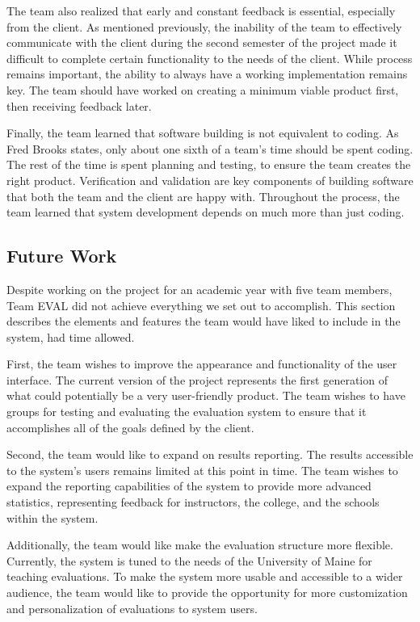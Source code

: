 \documentclass{article}
\begin{document}
The team also realized that early and constant feedback is essential, especially from the client. As mentioned previously, the inability of the team to effectively communicate with the client during the second semester of the project made it difficult to complete certain functionality to the needs of the client. While process remains important, the ability to always have a working implementation remains key. The team should have worked on creating a minimum viable product first, then receiving feedback later. 

Finally, the team learned that software building is not equivalent to coding. As Fred Brooks states, only about one sixth of a team's time should be spent coding. The rest of the time is spent planning and testing, to ensure the team creates the right product. Verification and validation are key components of building software that both the team and the client are happy with. Throughout the process, the team learned that system development depends on much more than just coding. 

\subsection{Future Work}

Despite working on the project for an academic year with five team members, Team EVAL did not achieve everything we set out to accomplish. This section describes the elements and features the team would have liked to include in the system, had time allowed. 

First, the team wishes to improve the appearance and functionality of the user interface. The current version of the project represents the first generation of what could potentially be a very user-friendly product. The team wishes to have groups for testing and evaluating the evaluation system to ensure that it accomplishes all of the goals defined by the client. 

Second, the team would like to expand on results reporting. The results accessible to the system's users remains limited at this point in time. The team wishes to expand the reporting capabilities of the system to provide more advanced statistics, representing feedback for instructors, the college, and the schools within the system. 

Additionally, the team would like make the evaluation structure more flexible. Currently, the system is tuned to the needs of the University of Maine for teaching evaluations. To make the system more usable and accessible to a wider audience, the team would like to provide the opportunity for more customization and personalization of evaluations to system users. 
\end{document}
